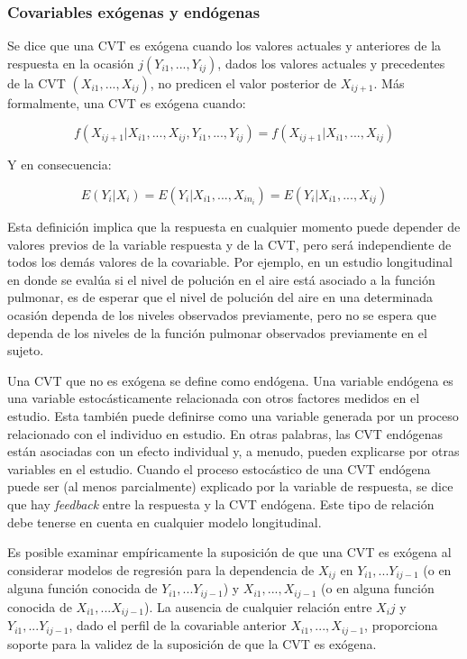 \documentclass[spanish]{article}
\numberwithin{figure}{subsection}
\numberwithin{equation}{subsection}
\numberwithin{table}{subsection}
\begin{document}
\subsubsection{Covariables exógenas y endógenas}

Se dice que una CVT es exógena cuando los valores actuales y anteriores de la
respuesta en la ocasión $j (Y_{i1}, ..., Y_{ij})$, dados los valores actuales y
precedentes de la CVT $(X_{i1}, ..., X_{ij})$, no predicen el valor posterior
de $X_{ij+1}$. Más formalmente, una CVT es exógena cuando:

\begin{equation}
	\label{exogeneidad}
	f(X_{ij+1}|X_{i1}, ..., X_{ij}, Y_{i1}, ..., Y_{ij}) =
	f(X_{ij+1}|X_{i1}, ..., X_{ij})
\end{equation}

Y en consecuencia:

\begin{equation}
	\label{exogeneidad debil}
	E(Y_i|X_i) = E(Y_i|X_{i1}, ..., X_{in_i}) = E(Y_i|X_{i1}, ..., X_{ij})
\end{equation}

Esta definición implica que la respuesta en cualquier momento puede depender de
valores previos de la variable respuesta y de la CVT, pero será independiente
de todos los demás valores de la covariable. Por ejemplo, en un estudio
longitudinal en donde se evalúa si el nivel de polución en el aire está
asociado a la función pulmonar, es de esperar que el nivel de polución del aire
en una determinada ocasión dependa de los niveles observados previamente, pero
no se espera que dependa de los niveles de la función pulmonar observados
previamente en el sujeto.

Una CVT que no es exógena se define como endógena. Una variable endógena es una
variable estocásticamente relacionada con otros factores medidos en el estudio.
Esta también puede definirse como una variable generada por un proceso
relacionado con el individuo en estudio. En otras palabras, las CVT endógenas
están asociadas con un efecto individual y, a menudo, pueden explicarse por
otras variables en el estudio. Cuando el proceso estocástico de una CVT
endógena puede ser (al menos parcialmente) explicado por la variable de
respuesta, se dice que hay \textit{feedback} entre la respuesta y la CVT
endógena. Este tipo de relación debe tenerse en cuenta en cualquier modelo
longitudinal.

Es posible examinar empíricamente la suposición de que una CVT es exógena al
considerar modelos de regresión para la dependencia de $X_{ij}$ en
$Y_{i1}, ... Y_{ij-1}$ (o en alguna función conocida de
$Y_{i1}, ... Y_{ij-1}$) y $X_{i1}, ..., X_{ij-1}$ (o en alguna función conocida
de $X_{i1}, ... X_{ij-1}$). La ausencia de cualquier relación entre $X_ij$ y
$Y_{i1}, ... Y_{ij-1}$, dado el perfil de la covariable anterior
$X_{i1}, ..., X_{ij-1}$, proporciona soporte para la validez de la suposición
de que la CVT es exógena.
\end{document}
